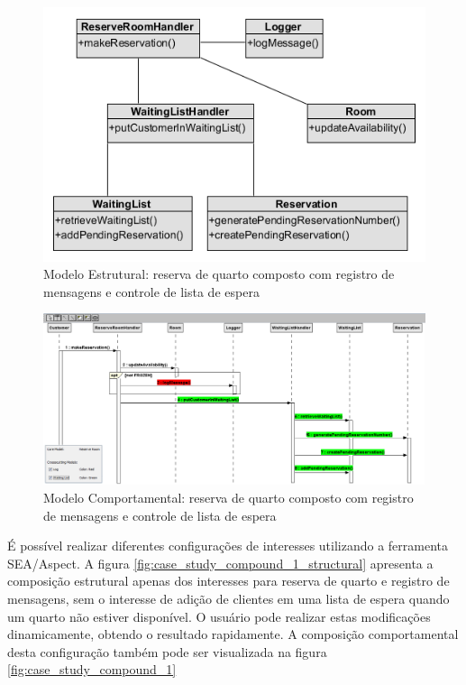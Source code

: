   \begin{figure}[!h]
	\centering
	\includegraphics{img/case_study_compound_2_structural.png}
	\caption{Modelo Estrutural: reserva de quarto composto com registro de mensagens e controle de lista de espera}\label{fig:case_study_compound_2_structural}
  \end{figure}
  
\begin{landscape}
  \begin{figure}[tb]
	\centering
	\includegraphics[scale=0.7]{img/case_study_compound_2.png}
	\caption{Modelo Comportamental: reserva de quarto composto com registro de mensagens e controle de lista de espera}\label{fig:case_study_compound_2}
  \end{figure}
\end{landscape}

É possível realizar diferentes configurações de interesses utilizando a ferramenta SEA/Aspect. A figura \ref{fig:case_study_compound_1_structural}
apresenta a composição estrutural apenas dos interesses para reserva de quarto e registro de mensagens, sem o interesse de adição de clientes em uma lista de
espera quando um quarto não estiver disponível. O usuário pode realizar estas modificações dinamicamente, obtendo o resultado rapidamente. A
composição comportamental desta configuração também pode ser visualizada na figura \ref{fig:case_study_compound_1}

